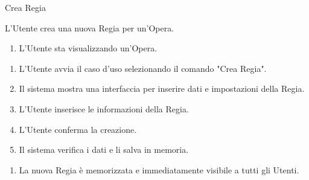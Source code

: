 {\ucExtTable	%
{	%
	Crea Regia
	
}{	%
	
}{	%
	L'Utente crea una nuova Regia per un'Opera.
	
}{	%
	\attori
	
}{	%
    \begin{enumerate}
        \item L'Utente sta visualizzando un'Opera.
    \end{enumerate}
	
}{	%
    \begin{enumerate}
        \item L'Utente avvia il caso d'uso selezionando il comando "Crea Regia".
        \item Il sistema mostra una interfaccia per inserire dati e impostazioni della Regia.
        \item L'Utente inserisce le informazioni della Regia.
        \item L'Utente conferma la creazione.
        \item Il sistema verifica i dati e li salva in memoria.
    \end{enumerate}
	
}{	%
	\begin{enumerate}
        \item La nuova Regia è memorizzata e immediatamente visibile a tutti gli Utenti.
    \end{enumerate}
	
} }

